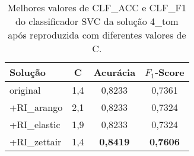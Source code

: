 \begin{table}[!thb]
    \centering
    \caption{Melhores valores de CLF\_ACC e CLF\_F1 do classificador SVC da solução 4\_tom após reproduzida com diferentes valores de C.}
    \begin{adjustbox}{max width={\textwidth},keepaspectratio}%
    \begin{tabular}{|l|c|c|c|}
        \hline
        \textbf{Solução}
        & \textbf{C}
        & \textbf{Acurácia}
        & \textbf{$F_1$-Score}
        \\ \hline
        original        
        & 1,4   & 0,8233   & 0,7361 
        \\ \hline
        +RI\_arango
        & 2,1   & 0,8233    & 0,7324          
        \\ \hline
        +RI\_elastic
        & 1,9   & 0,8233    & 0,7324        
        \\ \hline
        +RI\_zettair
        & 1,4   & \textbf{0,8419}    & \textbf{0,7606}          
        \\ 
        \hline
    \end{tabular}
    \end{adjustbox}
    \\
    \label{tab:reprodução-4-tom-c} 
\end{table}
